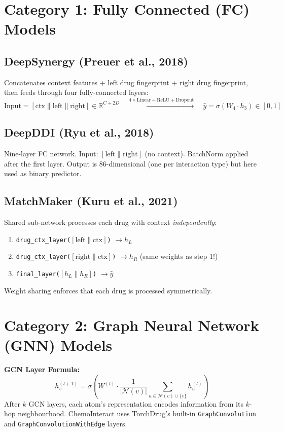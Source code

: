 \documentclass[12pt,a4paper,oneside]{book}
\begin{document}
\section{Category 1: Fully Connected (FC) Models}

\subsection{DeepSynergy (Preuer et al., 2018)}
Concatenates context features + left drug fingerprint + right drug fingerprint, then feeds through four fully-connected layers:
\[
\text{Input} = [\text{ctx}\|\text{left}\|\text{right}] \in \mathbb{R}^{C+2D}
\quad\xrightarrow{4\times\mathrm{Linear+ReLU+Dropout}}\quad
\hat{y} = \sigma(W_4 \cdot h_3) \in [0,1]
\]

\subsection{DeepDDI (Ryu et al., 2018)}
Nine-layer FC network. Input: $[\text{left} \| \text{right}]$ (no context). BatchNorm applied after the first layer. Output is 86-dimensional (one per interaction type) but here used as binary predictor.

\subsection{MatchMaker (Kuru et al., 2021)}
Shared sub-network processes each drug with context \textit{independently}:
\begin{enumerate}
  \item \texttt{drug\_ctx\_layer($[\text{left} \| \text{ctx}]$)} $\to h_L$
  \item \texttt{drug\_ctx\_layer($[\text{right} \| \text{ctx}]$)} $\to h_R$ \quad (same weights as step 1!)
  \item \texttt{final\_layer($[h_L \| h_R]$)} $\to \hat{y}$
\end{enumerate}
Weight sharing enforces that each drug is processed symmetrically.

\section{Category 2: Graph Neural Network (GNN) Models}

\begin{tcolorbox}[notebox]
\textbf{GCN Layer Formula:}
\[h_v^{(l+1)} = \sigma\!\left(W^{(l)} \cdot \frac{1}{|\mathcal{N}(v)|} \sum_{u \in \mathcal{N}(v)\cup\{v\}} h_u^{(l)}\right)\]
After $k$ GCN layers, each atom's representation encodes information from its $k$-hop neighbourhood. ChemoInteract uses TorchDrug's built-in \texttt{GraphConvolution} and \texttt{GraphConvolutionWithEdge} layers.
\end{tcolorbox}
\end{document}
